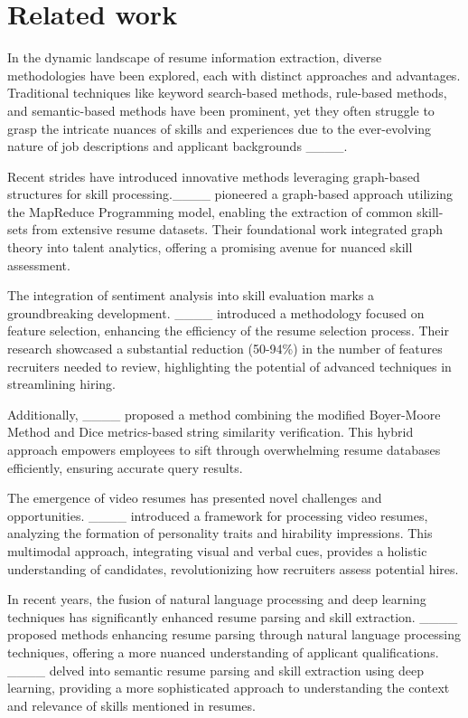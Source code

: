 \section{Related work}
In the dynamic landscape of resume information extraction, diverse methodologies have been explored, each with distinct approaches and advantages. Traditional techniques like keyword search-based methods, rule-based methods, and semantic-based methods have been prominent, yet they often struggle to grasp the intricate nuances of skills and experiences due to the ever-evolving nature of job descriptions and applicant backgrounds ____.

Recent strides have introduced innovative methods leveraging graph-based structures for skill processing.____ pioneered a graph-based approach utilizing the MapReduce Programming model, enabling the extraction of common skill-sets from extensive resume datasets. Their foundational work integrated graph theory into talent analytics, offering a promising avenue for nuanced skill assessment.

The integration of sentiment analysis into skill evaluation marks a groundbreaking development. ____
introduced a methodology focused on feature selection, enhancing the efficiency of the resume selection process. Their research showcased a substantial reduction (50-94\%) in the number of features recruiters needed to review, highlighting the potential of advanced techniques in streamlining hiring.

 Additionally, ____ proposed a method combining the modified Boyer-Moore Method and Dice metrics-based string similarity verification. This hybrid approach empowers employees to sift through overwhelming resume databases efficiently, ensuring accurate query results.

The emergence of video resumes has presented novel challenges and opportunities. ____ introduced a framework for processing video resumes, analyzing the formation of personality traits and hirability impressions. This multimodal approach, integrating visual and verbal cues, provides a holistic understanding of candidates, revolutionizing how recruiters assess potential hires.

In recent years, the fusion of natural language processing and deep learning techniques has significantly enhanced resume parsing and skill extraction. ____ proposed methods enhancing resume parsing through natural language processing techniques, offering a more nuanced understanding of applicant qualifications. ____ delved into semantic resume parsing and skill extraction using deep learning, providing a more sophisticated approach to understanding the context and relevance of skills mentioned in resumes.

